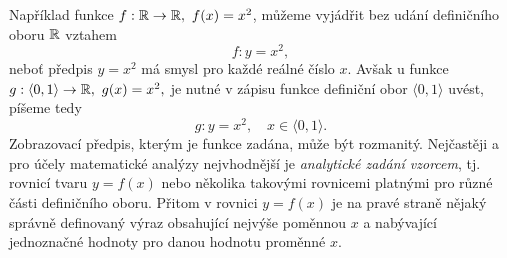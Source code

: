       Například funkce $f: \mathbb{R}\rightarrow\mathbb{R},\ f(x)=x^2$, můžeme vyjádřit bez udání definičního  
      oboru 
      $\mathbb{R}$ vztahem 
      \begin{equation*}
        f: y=x^2,
      \end{equation*}
      neboť předpis $y=x^2$ má smysl pro každé reálné číslo $x$. Avšak u funkce 
      $g:\langle0,1\rangle\rightarrow\realset,\ g(x)=x^2,$ je nutné v zápisu funkce definiční obor 
      $\langle0,1\rangle$ uvést, píšeme tedy   
      \begin{equation*}
        g: y=x^2, \quad x\in\langle0,1\rangle.
      \end{equation*}
      Zobrazovací předpis, kterým je funkce zadána, může být rozmanitý. Nejčastěji a pro účely matematické 
      analýzy nejvhodnější je \emph{analytické zadání vzorcem}, tj. rovnicí tvaru $y=f(x)$ nebo několika 
      takovými rovnicemi platnými pro různé části definičního oboru. Přitom v rovnici $y=f(x)$ je na pravé 
      straně nějaký správně definovaný výraz obsahující nejvýše poměnnou $x$ a nabývající jednoznačné hodnoty 
      pro danou hodnotu proměnné $x$.

